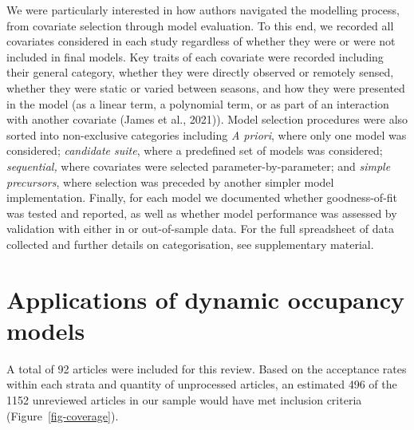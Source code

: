 \documentclass[
]{article}
\begin{document}
We were particularly interested in how authors navigated the modelling
process, from covariate selection through model evaluation. To this end,
we recorded all covariates considered in each study regardless of
whether they were or were not included in final models. Key traits of
each covariate were recorded including their general category, whether
they were directly observed or remotely sensed, whether they were static
or varied between seasons, and how they were presented in the model (as
a linear term, a polynomial term, or as part of an interaction with
another covariate (James et al., 2021)). Model selection procedures were
also sorted into non-exclusive categories including \emph{A priori},
where only one model was considered; \emph{candidate suite}, where a
predefined set of models was considered; \emph{sequential,} where
covariates were selected parameter-by-parameter; and \emph{simple
precursors}, where selection was preceded by another simpler model
implementation. Finally, for each model we documented whether
goodness-of-fit was tested and reported, as well as whether model
performance was assessed by validation with either in or out-of-sample
data. For the full spreadsheet of data collected and further details on
categorisation, see supplementary material.

\section{Applications of dynamic occupancy
models}\label{applications-of-dynamic-occupancy-models}

A total of 92 articles were included for this review. Based on the
acceptance rates within each strata and quantity of unprocessed
articles, an estimated 496 of the 1152 unreviewed articles in our sample
would have met inclusion criteria (Figure~\ref{fig-coverage}).
\end{document}
